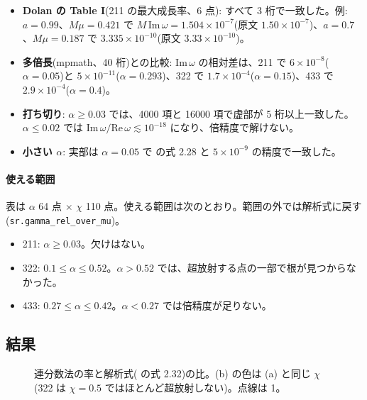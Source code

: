 \begin{itemize}
\item \textbf{Dolan の Table I}(211 の最大成長率、6 点): すべて 3 桁で一致した。例: $a=0.99$、$M\mu=0.421$ で $M\,\mathrm{Im}\,\omega=1.504\times10^{-7}$(原文 $1.50\times10^{-7}$)、$a=0.7$、$M\mu=0.187$ で $3.335\times10^{-10}$(原文 $3.33\times10^{-10}$)。
\item \textbf{多倍長}(mpmath、40 桁)との比較: $\mathrm{Im}\,\omega$ の相対差は、211 で $6\times10^{-8}$($\alpha=0.05$)と $5\times10^{-11}$($\alpha=0.293$)、322 で $1.7\times10^{-4}$($\alpha=0.15$)、433 で $2.9\times10^{-4}$($\alpha=0.4$)。
\item \textbf{打ち切り}: $\alpha\ge0.03$ では、4000 項と 16000 項で虚部が 5 桁以上一致した。$\alpha\le0.02$ では $\mathrm{Im}\,\omega/\mathrm{Re}\,\omega\lesssim10^{-18}$ になり、倍精度で解けない。
\item \textbf{小さい $\alpha$}: 実部は $\alpha=0.05$ で  の式 2.28 と $5\times10^{-9}$ の精度で一致した。
\end{itemize}

\paragraph{使える範囲}
表は $\alpha$ 64 点 $\times$ $\chi$ 110 点。使える範囲は次のとおり。範囲の外では解析式に戻す(\texttt{sr.gamma\_rel\_over\_mu})。
\begin{itemize}
\item 211: $\alpha\ge0.03$。欠けはない。
\item 322: $0.1\le\alpha\le0.52$。$\alpha>0.52$ では、超放射する点の一部で根が見つからなかった。
\item 433: $0.27\le\alpha\le0.42$。$\alpha<0.27$ では倍精度が足りない。
\end{itemize}

\subsection{結果}

\begin{figure}[H]
\centering

\caption{連分数法の率と解析式( の式 2.32)の比。(b) の色は (a) と同じ $\chi$(322 は $\chi=0.5$ ではほとんど超放射しない)。点線は 1。}
\label{fig:e04}
\end{figure}

